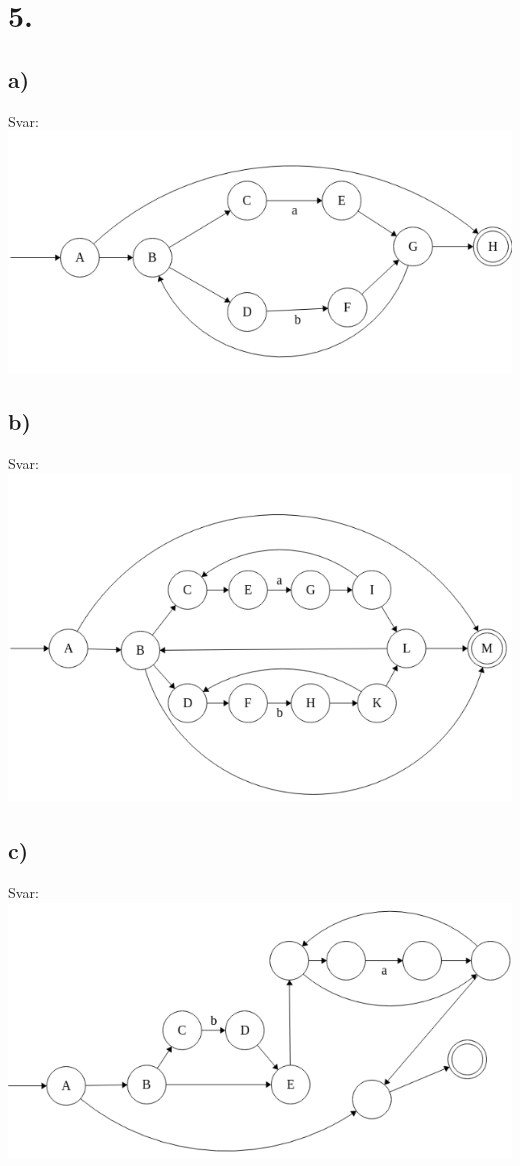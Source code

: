\documentclass[]{article}
\begin{document}
\section*{5.}

\subsection*{a)}
Svar:\\
\includegraphics[scale=0.7]{NFAa}

\subsection*{b)}
Svar: \\
\includegraphics*[scale=0.6]{NFAb}

\subsection*{c)}
Svar: \\
\includegraphics*[scale=0.6]{NFAc}
\end{document}
